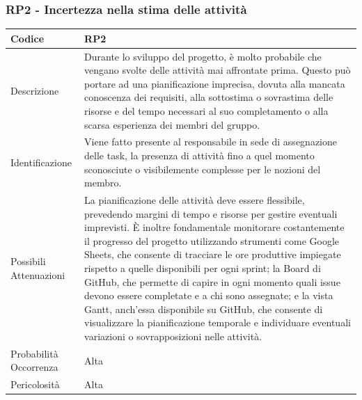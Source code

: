 \documentclass[10pt]{article}
\begin{document}
{    \subsubsection{RP2 - Incertezza nella stima delle attività}
    \label{RP2}
    \begin{tabularx}{\textwidth}{|l|X|}
    \hline
    Codice & RP2 \\
    \hline
    Descrizione &  Durante lo sviluppo del progetto, è molto probabile che vengano svolte delle attività mai affrontate prima. Questo può portare ad una pianificazione imprecisa, dovuta alla mancata conoscenza dei requisiti, alla sottostima o sovrastima delle risorse e del tempo necessari al suo completamento o alla scarsa esperienza dei membri del gruppo. \\
    \hline
    Identificazione &  Viene fatto presente al responsabile in sede di assegnazione delle task, la presenza di attività fino a quel momento sconosciute o visibilemente complesse per le nozioni del membro.\\ 
    \hline
    Possibili Attenuazioni &  La pianificazione delle attività deve essere flessibile, prevedendo margini di tempo e risorse per gestire eventuali imprevisti. È inoltre fondamentale monitorare costantemente il progresso del progetto utilizzando strumenti come Google Sheets, che consente di tracciare le ore produttive impiegate rispetto a quelle disponibili per ogni sprint; la Board di GitHub, che permette di capire in ogni momento quali issue devono essere completate e a chi sono assegnate; e la vista Gantt, anch'essa disponibile su GitHub, che consente di visualizzare la pianificazione temporale e individuare eventuali variazioni o sovrapposizioni nelle attività. \\
    \hline
    Probabilità Occorrenza &  Alta \\
    \hline
    Pericolosità & Alta \\ 
    \hline
    \end{tabularx}


}
\end{document}
